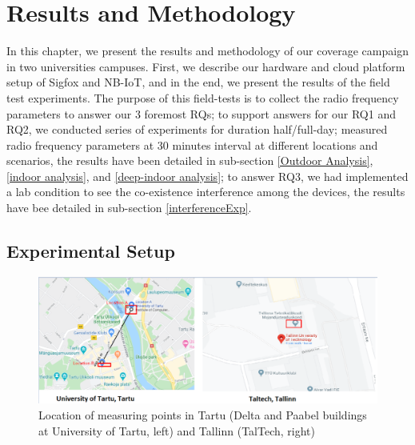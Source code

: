 \documentclass[12pt]{article}
\begin{document}
\section{Results and Methodology}\label{Results and Methodology}
In this chapter, we present the results and methodology of our coverage campaign in two universities campuses. First, we describe our hardware and cloud platform setup of Sigfox and NB-IoT, and in the end, we present the results of the field test experiments. The purpose of this field-tests is to collect the radio frequency parameters to answer our 3 foremost RQs; to support answers for our RQ1 and RQ2, we conducted series of experiments for duration half/full-day; measured radio frequency parameters at 30 minutes interval at different locations and scenarios, the results have been detailed in sub-section \ref{Outdoor Analysis}, \ref{indoor analysis}, and \ref{deep-indoor analysis}; to answer RQ3, we had implemented a lab condition to see the co-existence interference among the devices, the results have bee detailed in sub-section \ref{interferenceExp}.




\subsection{Experimental Setup}



\begin{figure}[!h]
    \centering
    \includegraphics[width=0.9\columnwidth]{Images/locations.pdf}
    \caption{Location  of  measuring  points  in  Tartu  (Delta and Paabel buildings at  University  of  Tartu,  left)  and  Tallinn (TalTech, right)}
    \label{fig:Observation locations}
\end{figure}
\end{document}
